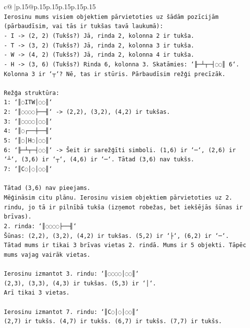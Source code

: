 \documentclass{article}
\begin{document}
{\begin{supertabular}{c@{$\;$}|p{.15\linewidth}@{}p{.15\linewidth}p{.15\linewidth}p{.15\linewidth}p{.15\linewidth}p{.15\linewidth}}
{{{\\ 
\texttt{Ierosinu mums visiem objektiem pārvietoties uz šādām pozīcijām (pārbaudīsim, vai tās ir tukšas tavā laukumā):} \\
\texttt{{-} I {-}> (2, 2) (Tukšs?) Jā, rinda 2, kolonna 2 ir tukša.} \\
\texttt{{-} T {-}> (3, 2) (Tukšs?) Jā, rinda 2, kolonna 3 ir tukša.} \\
\texttt{{-} W {-}> (4, 2) (Tukšs?) Jā, rinda 2, kolonna 4 ir tukša.} \\
\texttt{{-} H {-}> (3, 6) (Tukšs?) Rinda 6, kolonna 3. Skatāmies: `╟─┴┬─┤◌◌║ 6`. Kolonna 3 ir `┬`? Nē, tas ir stūris. Pārbaudīsim režģi precīzāk.} \\
\\ 
\texttt{Režģa struktūra:} \\
\texttt{1: `║◌ITW│◌◌║`} \\
\texttt{2: `║◌◌◌◌├──╢` {-}> (2,2), (3,2), (4,2) ir tukšas.} \\
\texttt{3: `║◌◌◌◌│◌◌║`} \\
\texttt{4: `║◌┌──┼──╢`} \\
\texttt{5: `║◌│H◌│◌◌║`} \\
\texttt{6: `╟─┴┬─┤◌◌║` {-}> Šeit ir sarežģīti simboli. (1,6) ir `─`, (2,6) ir `┴`, (3,6) ir `┬`, (4,6) ir `─`. Tātad (3,6) nav tukšs.} \\
\texttt{7: `║C◌│◌│◌◌║`} \\
\\ 
\texttt{Tātad (3,6) nav pieejams.} \\
\texttt{Mēģināsim citu plānu. Ierosinu visiem objektiem pārvietoties uz 2. rindu, jo tā ir pilnībā tukša (izņemot robežas, bet iekšējās šūnas ir brīvas).} \\
\texttt{2. rinda: `║◌◌◌◌├──╢`} \\
\texttt{Šūnas: (2,2), (3,2), (4,2) ir tukšas. (5,2) ir `├`, (6,2) ir `─`.} \\
\texttt{Tātad mums ir tikai 3 brīvas vietas 2. rindā. Mums ir 5 objekti. Tāpēc mums vajag vairāk vietas.} \\
\\ 
\texttt{Ierosinu izmantot 3. rindu: `║◌◌◌◌│◌◌║`} \\
\texttt{(2,3), (3,3), (4,3) ir tukšas. (5,3) ir `│`.} \\
\texttt{Arī tikai 3 vietas.} \\
\\ 
\texttt{Ierosinu izmantot 7. rindu: `║C◌│◌│◌◌║`} \\
\texttt{(2,7) ir tukšs. (4,7) ir tukšs. (6,7) ir tukšs. (7,7) ir tukšs.} \\
}}}
\end{supertabular}}
\end{document}
